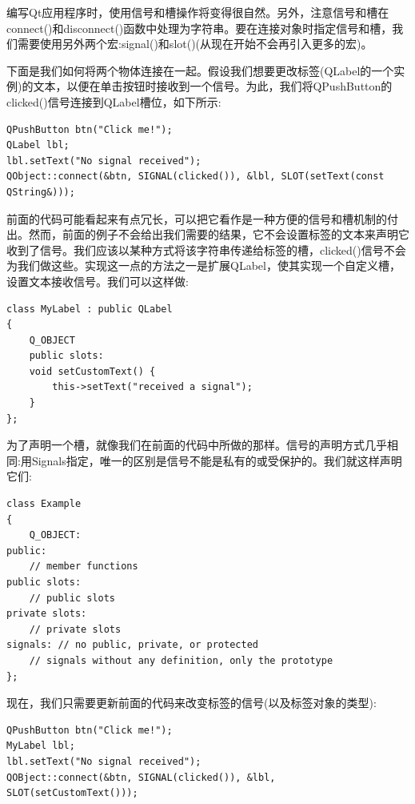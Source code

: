 编写Qt应用程序时，使用信号和槽操作将变得很自然。另外，注意信号和槽在connect()和disconnect()函数中处理为字符串。要在连接对象时指定信号和槽，我们需要使用另外两个宏:signal()和slot()(从现在开始不会再引入更多的宏)。 \par
下面是我们如何将两个物体连接在一起。假设我们想要更改标签(QLabel的一个实例)的文本，以便在单击按钮时接收到一个信号。为此，我们将QPushButton的clicked()信号连接到QLabel槽位，如下所示: \par

\begin{lstlisting}[caption={}]
QPushButton btn("Click me!");
QLabel lbl;
lbl.setText("No signal received");
QObject::connect(&btn, SIGNAL(clicked()), &lbl, SLOT(setText(const
QString&)));
\end{lstlisting}

前面的代码可能看起来有点冗长，可以把它看作是一种方便的信号和槽机制的付出。然而，前面的例子不会给出我们需要的结果，它不会设置标签的文本来声明它收到了信号。我们应该以某种方式将该字符串传递给标签的槽，clicked()信号不会为我们做这些。实现这一点的方法之一是扩展QLabel，使其实现一个自定义槽，设置文本接收信号。我们可以这样做: \par

\begin{lstlisting}[caption={}]
class MyLabel : public QLabel
{
	Q_OBJECT
	public slots:
	void setCustomText() {
		this->setText("received a signal");
	}
};
\end{lstlisting}

为了声明一个槽，就像我们在前面的代码中所做的那样。信号的声明方式几乎相同:用Signals指定，唯一的区别是信号不能是私有的或受保护的。我们就这样声明它们: \par

\begin{lstlisting}[caption={}]
class Example
{
	Q_OBJECT:
public:
	// member functions
public slots:
	// public slots
private slots:
	// private slots
signals: // no public, private, or protected
	// signals without any definition, only the prototype
};
\end{lstlisting}

现在，我们只需要更新前面的代码来改变标签的信号(以及标签对象的类型): \par

\begin{lstlisting}[caption={}]
QPushButton btn("Click me!");
MyLabel lbl;
lbl.setText("No signal received");
QOBject::connect(&btn, SIGNAL(clicked()), &lbl, SLOT(setCustomText()));
\end{lstlisting}

